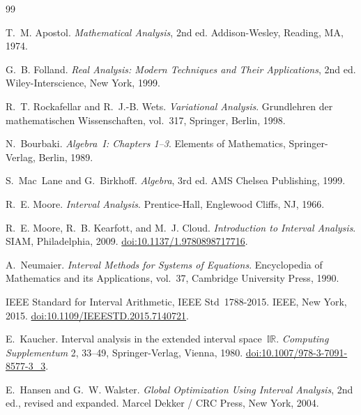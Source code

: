 \documentclass[11pt,a4paper]{article}
\theoremstyle{paperdef}
\begin{document}
\begin{thebibliography}{99}

T.~M. Apostol.
\newblock \emph{Mathematical Analysis}, 2nd ed.
\newblock Addison-Wesley, Reading, MA, 1974.

G.~B. Folland.
\newblock \emph{Real Analysis: Modern Techniques and Their
Applications}, 2nd ed.
\newblock Wiley-Interscience, New York, 1999.

R.~T. Rockafellar and R.~J.-B. Wets.
\newblock \emph{Variational Analysis}.
\newblock Grundlehren der mathematischen Wissenschaften, vol.~317,
Springer, Berlin, 1998.

N.~Bourbaki.
\newblock \emph{Algebra~I: Chapters 1--3}.
\newblock Elements of Mathematics, Springer-Verlag, Berlin, 1989.

S.~Mac~Lane and G.~Birkhoff.
\newblock \emph{Algebra}, 3rd ed.
\newblock AMS Chelsea Publishing, 1999.

R.~E. Moore.
\newblock \emph{Interval Analysis}.
\newblock Prentice-Hall, Englewood Cliffs, NJ, 1966.

R.~E. Moore, R.~B. Kearfott, and M.~J. Cloud.
\newblock \emph{Introduction to Interval Analysis}.
\newblock SIAM, Philadelphia, 2009.
\newblock \href{https://doi.org/10.1137/1.9780898717716}{doi:10.1137/1.9780898717716}.

A.~Neumaier.
\newblock \emph{Interval Methods for Systems of Equations}.
\newblock Encyclopedia of Mathematics and its Applications, vol.~37,
Cambridge University Press, 1990.

IEEE Standard for Interval Arithmetic, IEEE Std~1788-2015.
\newblock IEEE, New York, 2015.
\newblock \href{https://doi.org/10.1109/IEEESTD.2015.7140721}{doi:10.1109/IEEESTD.2015.7140721}.

E.~Kaucher.
\newblock Interval analysis in the extended interval space~$\mathbb{IR}$.
\newblock \emph{Computing Supplementum} 2, 33--49, Springer-Verlag,
Vienna, 1980.
\newblock \href{https://doi.org/10.1007/978-3-7091-8577-3_3}{doi:10.1007/978-3-7091-8577-3\_3}.

E.~Hansen and G.~W. Walster.
\newblock \emph{Global Optimization Using Interval Analysis}, 2nd ed.,
revised and expanded.
\newblock Marcel Dekker / CRC Press, New York, 2004.


\end{thebibliography}
\end{document}
